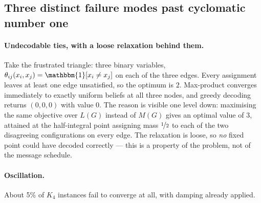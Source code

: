 \subsection{Three distinct failure modes past cyclomatic number one}

\paragraph{Undecodable ties, with a loose relaxation behind them.} Take the frustrated triangle: three binary variables, $\theta_{ij}(x_i, x_j) = \mathbbm{1}[x_i \neq x_j]$ on each of the three edges. Every assignment leaves at least one edge unsatisfied, so the optimum is $2$. Max-product converges immediately to exactly uniform beliefs at all three nodes, and greedy decoding returns $(0,0,0)$ with value $0$. The reason is visible one level down: maximising the same objective over $L(G)$ instead of $M(G)$ gives an optimal value of $3$, attained at the half-integral point assigning mass $\nicefrac{1}{2}$ to each of the two disagreeing configurations on every edge. The relaxation is loose, so \emph{no} fixed point could have decoded correctly --- this is a property of the problem, not of the message schedule.

\paragraph{Oscillation.} About 5\% of $K_4$ instances fail to converge at all, with damping already applied.

